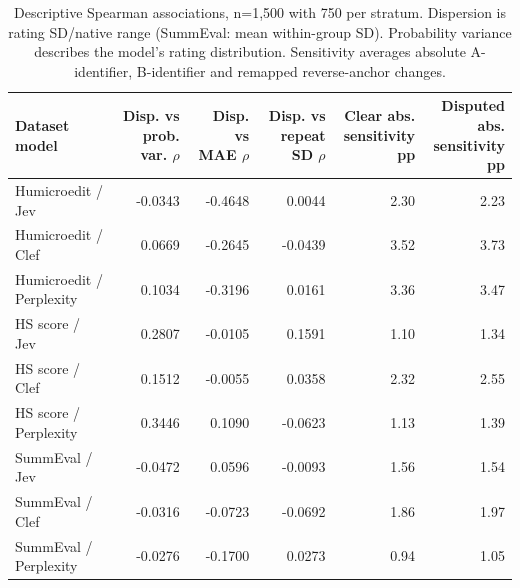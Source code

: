 \begin{table}[t]
\centering\footnotesize
\setlength{\tabcolsep}{3.5pt}
\begin{tabular}{@{}lrrrrr@{}}
\toprule
\shortstack[l]{Dataset\\{}model} & \shortstack[l]{Disp. vs\\{}prob. var. $\rho$} & \shortstack[l]{Disp. vs\\{}MAE $\rho$} & \shortstack[l]{Disp. vs\\{}repeat SD $\rho$} & \shortstack[l]{Clear abs.\\{}sensitivity pp} & \shortstack[l]{Disputed abs.\\{}sensitivity pp} \\
\midrule
Humicroedit / Jev & -0.0343 & -0.4648 & 0.0044 & 2.30 & 2.23 \\
Humicroedit / Clef & 0.0669 & -0.2645 & -0.0439 & 3.52 & 3.73 \\
Humicroedit / Perplexity & 0.1034 & -0.3196 & 0.0161 & 3.36 & 3.47 \\
HS score / Jev & 0.2807 & -0.0105 & 0.1591 & 1.10 & 1.34 \\
HS score / Clef & 0.1512 & -0.0055 & 0.0358 & 2.32 & 2.55 \\
HS score / Perplexity & 0.3446 & 0.1090 & -0.0623 & 1.13 & 1.39 \\
SummEval / Jev & -0.0472 & 0.0596 & -0.0093 & 1.56 & 1.54 \\
SummEval / Clef & -0.0316 & -0.0723 & -0.0692 & 1.86 & 1.97 \\
SummEval / Perplexity & -0.0276 & -0.1700 & 0.0273 & 0.94 & 1.05 \\
\bottomrule
\end{tabular}
\caption{Descriptive Spearman associations, n=1,500 with 750 per stratum. Dispersion is rating SD/native range (SummEval: mean within-group SD). Probability variance describes the model's rating distribution. Sensitivity averages absolute A-identifier, B-identifier and remapped reverse-anchor changes.}
\label{tab:appendix_disagreement_score}
\end{table}
